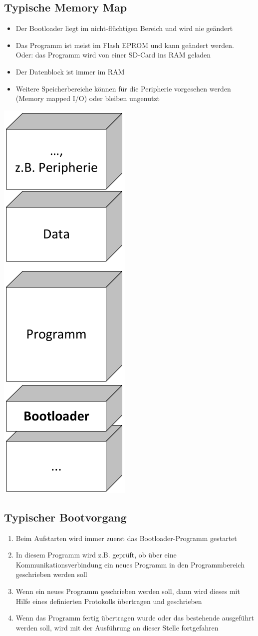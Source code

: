 \subsection{Typische Memory Map}
\begin{multicols}{2}
\begin{itemize}
  \item Der Bootloader liegt im nicht-flüchtigen Bereich und wird nie geändert
  \item Das Programm ist meist im Flash EPROM und kann geändert werden.\\ Oder: das Programm wird von einer SD-Card ins RAM geladen
  \item Der Datenblock ist immer im RAM
  \item Weitere Speicherbereiche können für die Peripherie vorgesehen werden (Memory mapped I/O) oder bleiben ungenutzt
\end{itemize}
\vfill\null
\columnbreak
\begin{center}
\includegraphics[width=0.2\linewidth]{images/Bootstrap/memoryMap}
\end{center}
\end{multicols}

\subsection{Typischer Bootvorgang}
\begin{enumerate}
  \item Beim Aufstarten wird immer zuerst das Bootloader-Programm gestartet
  \item In diesem Programm wird z.B. geprüft, ob über eine Kommunikationsverbindung ein neues Programm in den Programmbereich geschrieben werden soll
  \item Wenn ein neues Programm geschrieben werden soll, dann wird dieses mit Hilfe eines definierten Protokolls übertragen und geschrieben
  \item Wenn das Programm fertig übertragen wurde oder das bestehende ausgeführt werden soll, wird mit der Ausführung an dieser Stelle fortgefahren
\end{enumerate}

